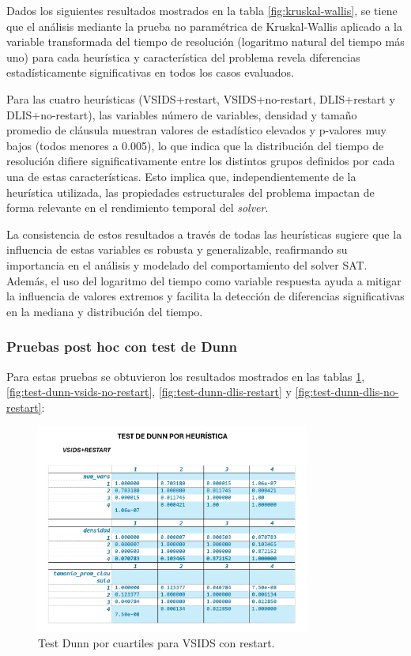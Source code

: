 Dados los siguientes resultados mostrados en la tabla \ref{fig:kruskal-wallis}, se tiene que el análisis mediante la prueba no paramétrica de Kruskal-Wallis aplicado a la variable transformada del tiempo de resolución (logaritmo natural del tiempo más uno) para cada heurística y característica del problema revela diferencias estadísticamente significativas en todos los casos evaluados.

Para las cuatro heurísticas (VSIDS+restart, VSIDS+no-restart, DLIS+restart y DLIS+no-restart), las variables número de variables, densidad y tamaño promedio de cláusula muestran valores de estadístico elevados y p-valores muy bajos (todos menores a 0.005), lo que indica que la distribución del tiempo de resolución difiere significativamente entre los distintos grupos definidos por cada una de estas características. Esto implica que, independientemente de la heurística utilizada, las propiedades estructurales del problema impactan de forma relevante en el rendimiento temporal del \textit{solver}.

La consistencia de estos resultados a través de todas las heurísticas sugiere que la influencia de estas variables es robusta y generalizable, reafirmando su importancia en el análisis y modelado del comportamiento del solver SAT. Además, el uso del logaritmo del tiempo como variable respuesta ayuda a mitigar la influencia de valores extremos y facilita la detección de diferencias significativas en la mediana y distribución del tiempo. 

\subsubsection{Pruebas post hoc con test de Dunn}

Para estas pruebas se obtuvieron los resultados mostrados en las tablas \ref{fig:test-dunn-vsids-restart}, \ref{fig:test-dunn-vsids-no-restart}, \ref{fig:test-dunn-dlis-restart} y \ref{fig:test-dunn-dlis-no-restart}:

\begin{figure}[ht]
    \centering
    \includegraphics[width=0.8\textwidth]{Graphics/test_dunn_vsids_restart.png}
    \caption{Test Dunn por cuartiles para VSIDS con restart.}
    \label{fig:test-dunn-vsids-restart}
\end{figure}

